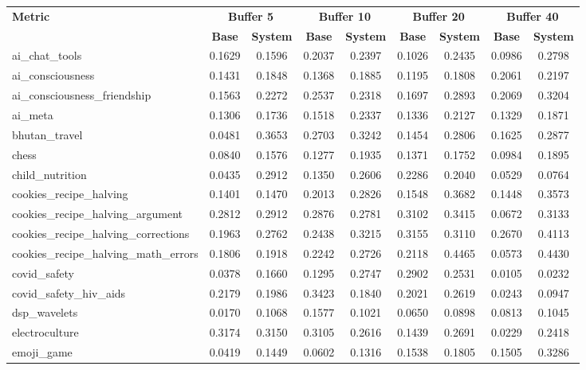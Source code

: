 \begin{landscape}
\begin{longtable}{@{}p{3.8cm}cccccccc@{}}
\toprule
\textbf{Metric} & \multicolumn{2}{c}{\textbf{Buffer 5}} & \multicolumn{2}{c}{\textbf{Buffer 10}} & \multicolumn{2}{c}{\textbf{Buffer 20}} & \multicolumn{2}{c}{\textbf{Buffer 40}} \\
\cmidrule(lr){2-3}\cmidrule(lr){4-5}\cmidrule(lr){6-7}\cmidrule(lr){8-9}
 & \textbf{Base} & \textbf{System} & \textbf{Base} & \textbf{System} & \textbf{Base} & \textbf{System} & \textbf{Base} & \textbf{System} \\
\midrule
\endhead
ai\_chat\_tools & 0.1629 & 0.1596 & 0.2037 & 0.2397 & 0.1026 & 0.2435 & 0.0986 & 0.2798 \\
ai\_consciousness & 0.1431 & 0.1848 & 0.1368 & 0.1885 & 0.1195 & 0.1808 & 0.2061 & 0.2197 \\
ai\_consciousness\_friendship & 0.1563 & 0.2272 & 0.2537 & 0.2318 & 0.1697 & 0.2893 & 0.2069 & 0.3204 \\
ai\_meta & 0.1306 & 0.1736 & 0.1518 & 0.2337 & 0.1336 & 0.2127 & 0.1329 & 0.1871 \\
bhutan\_travel & 0.0481 & 0.3653 & 0.2703 & 0.3242 & 0.1454 & 0.2806 & 0.1625 & 0.2877 \\
chess & 0.0840 & 0.1576 & 0.1277 & 0.1935 & 0.1371 & 0.1752 & 0.0984 & 0.1895 \\
child\_nutrition & 0.0435 & 0.2912 & 0.1350 & 0.2606 & 0.2286 & 0.2040 & 0.0529 & 0.0764 \\
cookies\_recipe\_halving & 0.1401 & 0.1470 & 0.2013 & 0.2826 & 0.1548 & 0.3682 & 0.1448 & 0.3573 \\
cookies\_recipe\_halving\_argument & 0.2812 & 0.2912 & 0.2876 & 0.2781 & 0.3102 & 0.3415 & 0.0672 & 0.3133 \\
cookies\_recipe\_halving\_corrections & 0.1963 & 0.2762 & 0.2438 & 0.3215 & 0.3155 & 0.3110 & 0.2670 & 0.4113 \\
cookies\_recipe\_halving\_math\_errors & 0.1806 & 0.1918 & 0.2242 & 0.2726 & 0.2118 & 0.4465 & 0.0573 & 0.4430 \\
covid\_safety & 0.0378 & 0.1660 & 0.1295 & 0.2747 & 0.2902 & 0.2531 & 0.0105 & 0.0232 \\
covid\_safety\_hiv\_aids & 0.2179 & 0.1986 & 0.3423 & 0.1840 & 0.2021 & 0.2619 & 0.0243 & 0.0947 \\
dsp\_wavelets & 0.0170 & 0.1068 & 0.1577 & 0.1021 & 0.0650 & 0.0898 & 0.0813 & 0.1045 \\
electroculture & 0.3174 & 0.3150 & 0.3105 & 0.2616 & 0.1439 & 0.2691 & 0.0229 & 0.2418 \\
emoji\_game & 0.0419 & 0.1449 & 0.0602 & 0.1316 & 0.1538 & 0.1805 & 0.1505 & 0.3286 \\

\end{longtable}
\end{landscape}
